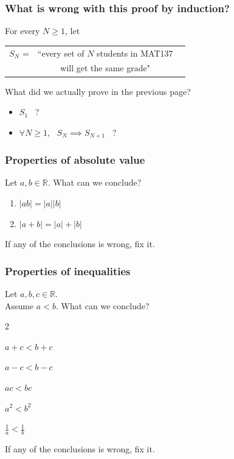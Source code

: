 \begin{frame}
	\frametitle{What is wrong with this proof by induction?}

	For every $N \geq 1$, let
	\begin{center}
		\begin{tabular}{rcc}
			$\displaystyle S_{N}$ = & ``every set of $N$ students in MAT137 \\
			                        & will get the same grade"
		\end{tabular}
	\end{center}

	\vfill

	What did we actually prove in the previous page?

	\begin{itemize}
		\item $S_{1}$ \, ?

		\item $\displaystyle \forall N \geq 1$, \,
			$\displaystyle S_{N}\implies S_{N+1}$ \, ?
	\end{itemize}

	\vfill
\end{frame}

\begin{frame}
	\frametitle{Properties of absolute value}

	Let $a, b \in \mathbb{R}$. What can we conclude?

	\begin{enumerate}
		\item $\displaystyle |ab| = |a| |b|$

		\item $\displaystyle |a + b | = |a| + |b|$
	\end{enumerate}

	If any of the conclusions is wrong, fix it.
\end{frame}

\begin{frame}
	\frametitle{Properties of inequalities}

	Let $a, b, c \in \mathbb{R}$. \\ Assume $a < b$. What can we conclude?

	\begin{enumerate}
	\end{enumerate}

	If any of the conclusions is wrong, fix it.
\end{frame}

